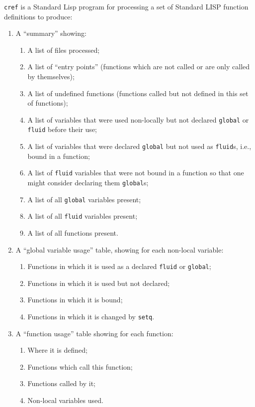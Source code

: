 \texttt{cref} is a Standard Lisp program for processing a
set of Standard LISP function definitions to produce:
\begin{enumerate}
\item A ``summary'' showing:
\begin{enumerate}
\item A list of files processed;
\item A list of ``entry points'' (functions which are not called or
are only called by themselves);
\item A list of undefined functions (functions called but not
defined in this set of functions);
\item A list of variables that were used non-locally but not
declared \texttt{global} or \texttt{fluid} before their use;
\item A list of variables that were declared \texttt{global} but not used
as \texttt{fluid}s, i.e., bound in a function;
\item A list of \texttt{fluid} variables that were not bound in a function
so that one might consider declaring them \texttt{global}s;
\item A list of all \texttt{global} variables present;
\item A list of all \texttt{fluid} variables present;
\item A list of all functions present.
\end{enumerate}
\item A ``global variable usage'' table, showing for each non-local
   variable:
\begin{enumerate}
\item Functions in which it is used as a declared \texttt{fluid} or \texttt{global};
\item Functions in which it is used but not declared;
\item Functions in which it is bound;
\item Functions in which it is changed by \texttt{setq}.
\end{enumerate}
\item A ``function usage'' table showing for each function:
\begin{enumerate}
\item Where it is defined;
\item Functions which call this function;
\item Functions called by it;
\item Non-local variables used.
\end{enumerate}
\end{enumerate}

